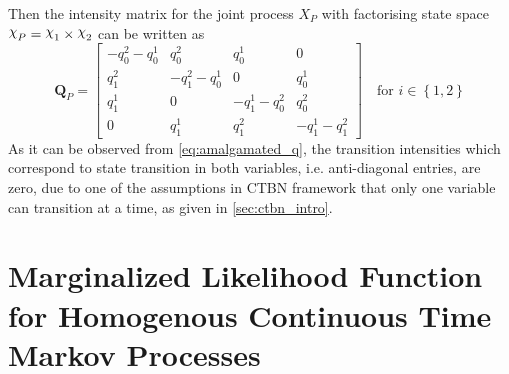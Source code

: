 Then the intensity matrix for the joint process $ X_P $ with factorising state space $ \rchi_P = \rchi_1 \times \rchi_2 $ can be written as
\begin{equation}
\textbf{Q}_P = 
\begin{bmatrix}
-q^{2}_{0}-q^{1}_{0} & q^{2}_{0} & q^{1}_{0} & 0 \\
q^{2}_{1} & -q^{2}_{1}-q^{1}_{0} & 0 & q^{1}_{0} \\
q^{1}_{1} & 0 & -q^{1}_{1}-q^{2}_{0} & q^{2}_{0} \\
0 & q^{1}_{1} & q^{2}_{1} & -q^{1}_{1}-q^{2}_{1}
\end{bmatrix} \quad \text{for } i \in \left\lbrace 1,2\right\rbrace 
\label{eq:amalgamated_q}
\end{equation}
As it can be observed from \autoref{eq:amalgamated_q}, the transition intensities which correspond to state transition in both variables, i.e. anti-diagonal entries, are zero, due to one of the assumptions in CTBN framework that only one variable can transition at a time, as given in \cref{sec:ctbn_intro}.
\chapter{Marginalized Likelihood Function for Homogenous Continuous Time Markov Processes}
\label{ap:marg_llh_ctmp}

